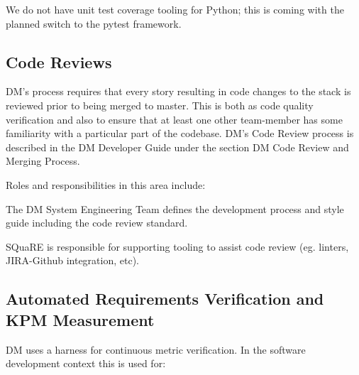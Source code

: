 \begin{note} We do not have unit test coverage tooling for Python; this is coming with the planned switch to the pytest framework. \end{note}

\subsection{Code Reviews}

DM’s process requires that every story resulting in code changes to the stack is reviewed prior to being merged to master. This is both as code quality verification and also to ensure that at least one other team-member has some familiarity with a particular part of the codebase. DM’s Code Review process is described in the DM Developer Guide under the section DM Code Review and Merging Process.

Roles and responsibilities in this area include:

\begin{itemize_single}

\item The DM System Engineering Team  defines the development process and style guide including the code review standard.

\item SQuaRE is responsible for supporting tooling to assist code review (eg. linters, JIRA-Github integration, etc). 

\end{itemize_single}
  
\subsection{Automated Requirements Verification and KPM Measurement}

DM uses a harness for continuous metric verification. In the software development context this is used for:

